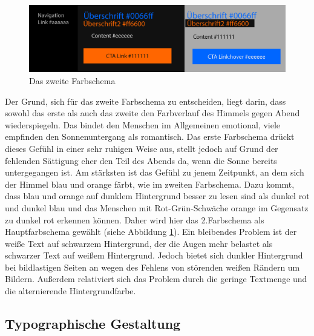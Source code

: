 \begin{figure} [h]
\includegraphics[width=\textwidth]{./img/inno_col2.png}
\caption{Das zweite Farbschema}
\label{inno_Farbschemen2}
\end{figure}

Der Grund, sich für das zweite Farbschema zu entscheiden, liegt darin, dass sowohl das erste als auch das zweite den Farbverlauf des Himmels gegen Abend wiederspiegeln. Das bindet den Menschen im Allgemeinen emotional, viele empfinden den Sonnenuntergang als romantisch. Das erste Farbschema drückt dieses Gefühl in einer sehr ruhigen Weise aus, stellt jedoch auf Grund der fehlenden Sättigung eher den Teil des Abends da, wenn die Sonne bereits untergegangen ist. Am stärksten ist das Gefühl zu jenem Zeitpunkt, an dem sich der Himmel blau und orange färbt, wie im zweiten Farbschema. Dazu kommt, dass blau und orange auf dunklem Hintergrund besser zu lesen sind als dunkel rot und dunkel blau und das Menschen mit Rot-Grün-Schwäche orange im Gegensatz zu dunkel rot erkennen können. Daher wird hier das 2.Farbschema als Hauptfarbschema gewählt (siehe Abbildung \ref{inno_Farbschemen2}).
Ein bleibendes Problem ist der weiße Text auf schwarzem Hintergrund, der die Augen mehr belastet als schwarzer Text auf weißem Hintergrund. Jedoch bietet sich dunkler Hintergrund bei bildlastigen Seiten an wegen des Fehlens von störenden weißen Rändern um Bildern. Außerdem relativiert sich das Problem durch die geringe Textmenge und die alternierende Hintergrundfarbe.


	\subsection{Typographische Gestaltung} 
	\label{typo_inno}

